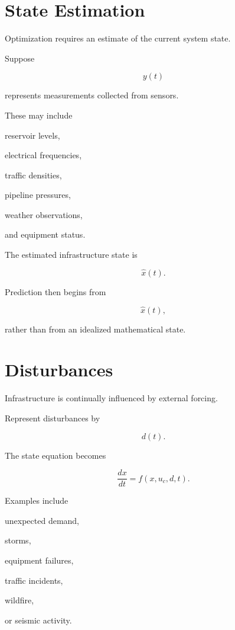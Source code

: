 \documentclass[11pt,fleqn]{book}
\numberwithin{equation}{chapter}
\theoremstyle{plain}
\theoremstyle{definition}
\theoremstyle{remark}
\begin{document}

\section{State Estimation}

Optimization requires an estimate of the current system state.

Suppose

\[
y(t)
\]

represents measurements collected from sensors.

These may include

reservoir levels,

electrical frequencies,

traffic densities,

pipeline pressures,

weather observations,

and equipment status.

The estimated infrastructure state is

\[
\hat{x}(t).
\]


Prediction then begins from

\[
\hat{x}(t),
\]

rather than from an idealized mathematical state.


\section{Disturbances}

Infrastructure is continually influenced by external forcing.

Represent disturbances by

\[
d(t).
\]

The state equation becomes

\[
\boxed{
\frac{dx}{dt}
=
f(x,u_c,d,t).
}
\]

Examples include

unexpected demand,

storms,

equipment failures,

traffic incidents,

wildfire,

or seismic activity.
\end{document}
